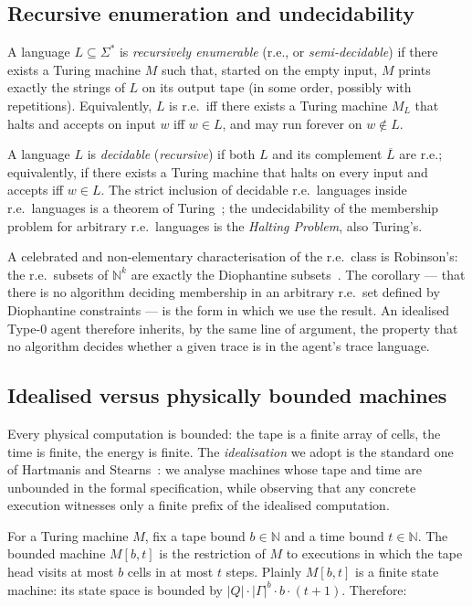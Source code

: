 \subsection{Recursive enumeration and undecidability}

A language $L\subseteq \Sigma^*$ is \emph{recursively enumerable}
(r.e., or \emph{semi-decidable}) if there exists a Turing machine
$M$ such that, started on the empty input, $M$ prints exactly the
strings of $L$ on its output tape (in some order, possibly with
repetitions).  Equivalently, $L$ is r.e.\ iff there exists a Turing
machine $M_L$ that halts and accepts on input $w$ iff $w\in L$,
and may run forever on $w\notin L$.

A language $L$ is \emph{decidable} (\emph{recursive}) if both $L$
and its complement $\overline{L}$ are r.e.; equivalently, if there
exists a Turing machine that halts on every input and accepts iff
$w\in L$.  The strict inclusion of decidable r.e.\ languages
inside r.e.\ languages is a theorem of
Turing~\cite{turing1936computable}; the undecidability of the
membership problem for arbitrary r.e.\ languages is the
\emph{Halting Problem}, also Turing's.

A celebrated and non-elementary characterisation of the r.e.\ class
is Robinson's:  the r.e.\ subsets of $\mathbb{N}^k$ are exactly the
Diophantine subsets~\cite{robinson1949definability,davis1961decision}.
The corollary --- that there is no algorithm deciding membership
in an arbitrary r.e.\ set defined by Diophantine constraints ---
is the form in which we use the result.  An idealised Type-0
agent therefore inherits, by the same line of argument, the
property that no algorithm decides whether a given trace is
in the agent's trace language.

\subsection{Idealised versus physically bounded machines}

Every physical computation is bounded: the tape is a finite array
of cells, the time is finite, the energy is finite.  The
\emph{idealisation} we adopt is the standard one of
Hartmanis and Stearns~\cite{hartmanis1965computational}: we
analyse machines whose tape and time are unbounded in the formal
specification, while observing that any concrete execution
witnesses only a finite prefix of the idealised computation.

For a Turing machine $M$, fix a tape bound $b\in\mathbb{N}$ and a
time bound $t\in\mathbb{N}$.  The bounded machine $M[b,t]$ is the
restriction of $M$ to executions in which the tape head visits at
most $b$ cells in at most $t$ steps.  Plainly $M[b,t]$ is a finite
state machine: its state space is bounded by $|Q|\cdot
|\Gamma|^b\cdot b\cdot (t+1)$.  Therefore:


